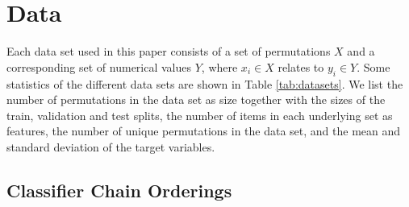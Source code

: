 \section{Data}
\label{data}

Each data set used in this paper consists of a set of permutations $X$ and a corresponding set of numerical values $Y$, where $x_i \in X$ relates to $y_i \in Y$. Some statistics of the different data sets are shown in Table \ref{tab:datasets}. We list the number of permutations in the data set as size together with the sizes of the train, validation and test splits, the number of items in each underlying set as features, the number of unique permutations in the data set, and the mean and standard deviation of the target variables.


\begin{table}
\begin{center}
\caption{Statistics of the different data sets.}
\label{tab:datasets}
\end{center}


\end{table}


\subsection{Classifier Chain Orderings}

